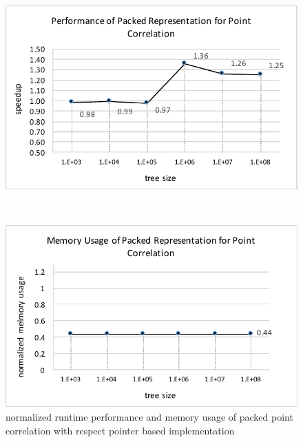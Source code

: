 \documentclass[a4paper,english]{lipics-v2016}
\begin{document}
  
\begin{figure}[htp]
\begin{minipage}{1.04\textwidth}
  \begin{minipage}{.49\textwidth}
    \centering
    \includegraphics[width=\textwidth]{./figs/pointCorr_perf.pdf}

  \end{minipage}
  $ $ 
  \begin{minipage}{.49\textwidth}
    \centering
    \includegraphics[width=\textwidth]{./figs/pointCorr_MemUsage.pdf}

  \end{minipage}
\end{minipage}
   \caption{normalized runtime performance and memory usage of packed point correlation with respect pointer based implementation }
         \label{fig:pointCorr}
\end{figure}
\end{document}
